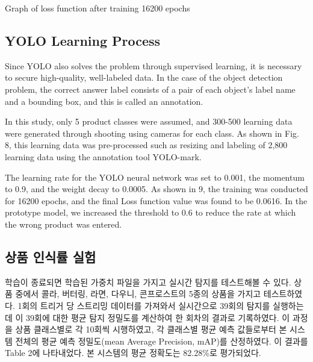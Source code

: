 \documentclass[smallextended]{svjour3}       %
\begin{document}
Graph of loss function after training 16200 epochs

\hypertarget{yolo-learning-process}{%
\subsection{YOLO Learning Process}\label{yolo-learning-process}}

Since YOLO also solves the problem through supervised learning, it is
necessary to secure high-quality, well-labeled data. In the case of the
object detection problem, the correct answer label consists of a pair of
each object's label name and a bounding box, and this is called an
annotation.

In this study, only 5 product classes were assumed, and 300-500 learning
data were generated through shooting using cameras for each class. As
shown in Fig. 8, this learning data was pre-processed such as resizing
and labeling of 2,800 learning data using the annotation tool YOLO-mark.

The learning rate for the YOLO neural network was set to 0.001, the
momentum to 0.9, and the weight decay to 0.0005. As shown in 9, the
training was conducted for 16200 epochs, and the final Loss function
value was found to be 0.0616. In the prototype model, we increased the
threshold to 0.6 to reduce the rate at which the wrong product was
entered.

\hypertarget{uxc0c1uxd488-uxc778uxc2dduxb960-uxc2e4uxd5d8}{%
\subsection{상품 인식률
실험}\label{uxc0c1uxd488-uxc778uxc2dduxb960-uxc2e4uxd5d8}}

학습이 종료되면 학습된 가중치 파일을 가지고 실시간 탐지를 테스트해볼 수
있다. 상품 중에서 콜라, 버터링, 라면, 다우니, 콘프로스트의 5종의 상품을
가지고 테스트하였다. 1회의 트리거 당 스트리밍 데이터를 가져와서
실시간으로 39회의 탐지를 실행하는데 이 39회에 대한 평균 탐지 정밀도를
계산하여 한 회차의 결과로 기록하였다. 이 과정을 상품 클래스별로 각
10회씩 시행하였고, 각 클래스별 평균 예측 값들로부터 본 시스템 전체의
평균 예측 정밀도(mean Average Precision, mAP)를 산정하였다. 이 결과를
Table 2에 나타내었다. 본 시스템의 평균 정확도는 82.28\%로 평가되었다.
\end{document}
